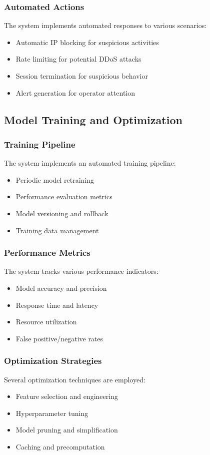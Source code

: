 \documentclass[12pt]{article}
\begin{document}
\subsubsection{Automated Actions}
The system implements automated responses to various scenarios:
\begin{itemize}
    \item Automatic IP blocking for suspicious activities
    \item Rate limiting for potential DDoS attacks
    \item Session termination for suspicious behavior
    \item Alert generation for operator attention
\end{itemize}

\subsection{Model Training and Optimization}
\subsubsection{Training Pipeline}
The system implements an automated training pipeline:
\begin{itemize}
    \item Periodic model retraining
    \item Performance evaluation metrics
    \item Model versioning and rollback
    \item Training data management
\end{itemize}

\subsubsection{Performance Metrics}
The system tracks various performance indicators:
\begin{itemize}
    \item Model accuracy and precision
    \item Response time and latency
    \item Resource utilization
    \item False positive/negative rates
\end{itemize}

\subsubsection{Optimization Strategies}
Several optimization techniques are employed:
\begin{itemize}
    \item Feature selection and engineering
    \item Hyperparameter tuning
    \item Model pruning and simplification
    \item Caching and precomputation
\end{itemize}
\end{document}
